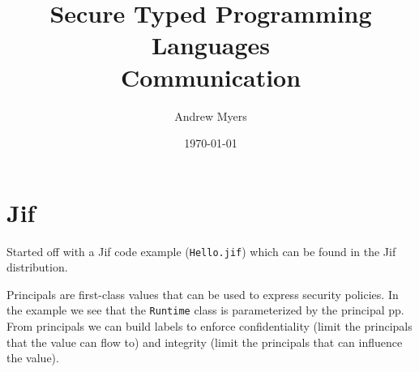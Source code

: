 \documentclass{article}
\begin{document}
%



%

\title{Secure Typed Programming Languages\\ Communication}
\author{Andrew Myers}
\date{\today}

\maketitle

\section{Jif}
Started off with a Jif code example (\texttt{Hello.jif}) which can be found in the Jif distribution. 



Principals are first-class values that can be used to express security policies. In the example we see that the \texttt{Runtime} class is parameterized by  the principal pp. From principals we can build labels to enforce confidentiality (limit the principals that the value can flow to) and integrity (limit the principals that can influence the value).
\end{document}
